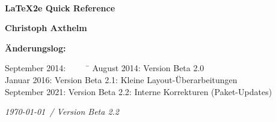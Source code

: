 
\begin{titlepage}
\thispagestyle{empty}
\normalsize

~
\vspace{2cm}
\begin{center} 
\bigskip		
\vspace{4ex}
{\Huge \bfseries \LaTeX2e{} Quick Reference}

\vspace{15ex}

\begin{doublespace}%
{
\Large%
\bfseries%
Christoph Axthelm\linebreak
}
\vfill

\begin{FlushLeft}
\textbf{Änderungslog:}  \\
%
\begin{tabbing}
September 2014: ~~~~~\= \kill
August 2014: 		\> Version Beta 2.0\\
Januar 2016: \> Version Beta 2.1: Kleine Layout-Überarbeitungen\\
September 2021:			\> Version Beta 2.2: Interne Korrekturen (Paket-Updates) \\
\end{tabbing}
%
\end{FlushLeft}

\vfill
\vfill
\vfill

\end{doublespace}%
\textit{\today \ / Version Beta 2.2}
\end{center}

\RaggedRight


\vfill

\end{titlepage}

